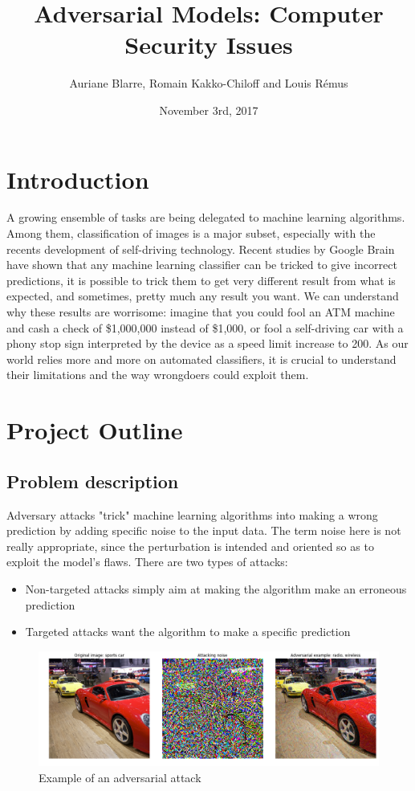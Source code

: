 \documentclass{article}
\title{Adversarial Models: Computer Security Issues}
\author{Auriane Blarre, Romain Kakko-Chiloff and Louis R\'emus}
\date{November 3rd,  2017}
\begin{document}
\maketitle

\section{Introduction}
A growing ensemble of tasks are being delegated to machine learning algorithms. Among them, classification of images is a major subset, especially with the recents development of self-driving technology. Recent studies by Google Brain have shown that any machine learning classifier can be tricked to give incorrect predictions, it is possible to trick them to get very different result from what is expected, and sometimes, pretty much any result you want.
\newline
We can understand why these results are worrisome: imagine that you could fool an ATM machine and cash a check of \$1,000,000 instead of \$1,000, or fool a self-driving car with a phony stop sign interpreted by the device as a speed limit increase to 200.
As our world relies more and more on automated classifiers, it is crucial to understand their limitations and the way wrongdoers could exploit them.

\section{Project Outline}
\subsection{Problem description}
Adversary attacks "trick" machine learning algorithms into making a wrong prediction by adding specific noise to the input data. The term noise here is not really appropriate, since the perturbation is intended and oriented so as to exploit the model's flaws.
\newline
There are two types of attacks:

\begin{itemize}
    \item Non-targeted attacks simply aim at making the algorithm make an erroneous prediction
    \item Targeted attacks want the algorithm to make a specific prediction
\end{itemize}

\begin{figure}[ht]
\includegraphics[width=\textwidth]{fig/adversarial_example_car.png}
\centering
\caption{Example of an adversarial attack}
\end{figure}
\end{document}
